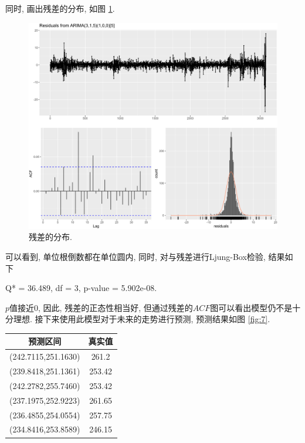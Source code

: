 \documentclass[12pt]{article}
\begin{document}
同时, 画出残差的分布, 如图 \ref{fig:m1res1}.
\begin{figure}[htbp]
    \centering
    \hspace{-10pt}\includegraphics[width=.6\textwidth]{m1res1}
    \caption{残差的分布. \label{fig:m1res1}}
\end{figure}

可以看到, 单位根倒数都在单位圆内, 同时, 对与残差进行Ljung-Box检验, 结果如下
\begin{center}
    Q* = 36.489, df = 3, p-value = 5.902e-08.
\end{center}
$p$值接近0, 因此, 残差的正态性相当好, 但通过残差的$ACF$图可以看出模型仍不是十分理想. 接下来使用此模型对于未来的走势进行预测, 预测结果如图 \ref{fig:7}.

\begin{table}[htpb]
    \centering
    \label{tab:my-table4}
    \begin{tabular}{cc}
    \hline
    \multicolumn{1}{c}{预测区间}                & \multicolumn{1}{c}{真实值}   \\ \hline
    \multicolumn{1}{c}{(242.7115,251.1630)} & \multicolumn{1}{c}{261.2} \\
    (239.8418,251.1361)                     & 253.42                    \\
    (242.2782,255.7460)                     & 253.42                    \\
    (237.1975,252.9223)                     & 261.65                    \\
    (236.4855,254.0554)                     & 257.75                    \\
    (234.8416,253.8589)                     & 246.15                    \\ \hline
    \end{tabular}
    \end{table}
\end{document}
